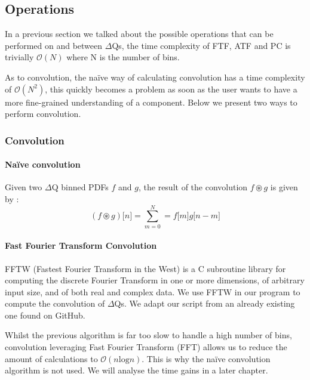       \subsection{Operations}
    In a previous section we talked about the possible operations that can be performed on and between $\Delta$Qs, the time complexity of FTF, ATF and PC is trivially $\mathcal{O}(N)$ where N is the number of bins.
    
    As to convolution, the naïve way of calculating convolution has a time complexity of $\mathcal{O}(N^2)$, this quickly becomes a problem as soon as the user wants to have a more fine-grained understanding of a component. Below we present two ways to perform convolution.

        \subsubsection{Convolution}
        
        \paragraph{Naïve convolution}
        Given two $\Delta$Q binned PDFs $f$ and $g$, the result of the convolution $f \circledast g$ is given by \cite{conv}: 
        \begin{equation}
            (f \circledast g)\lbrack n \rbrack = \sum_{m = 0}^{N} = f\lbrack m \rbrack g \lbrack n - m \rbrack  
            \label{eq:discconv}
        \end{equation}
 
    \paragraph{Fast Fourier Transform Convolution}
        FFTW (Fastest Fourier Transform in the West) is a C subroutine library \cite{fftw3} for computing the discrete Fourier Transform in one or more dimensions, of arbitrary input size, and of both real and complex data. We use FFTW in our program to compute the convolution of $\Delta$Qs. We adapt our script from an already existing one found on GitHub. \cite{fft}
    
    Whilst the previous algorithm is far too slow to handle a high number of bins, convolution leveraging Fast Fourier Transform (FFT) allows us to reduce the amount of calculations to $\mathcal{O}(n \text{log} n)$. This is why the naïve convolution algorithm is not used. We will analyse the time gains in a later chapter.
    
